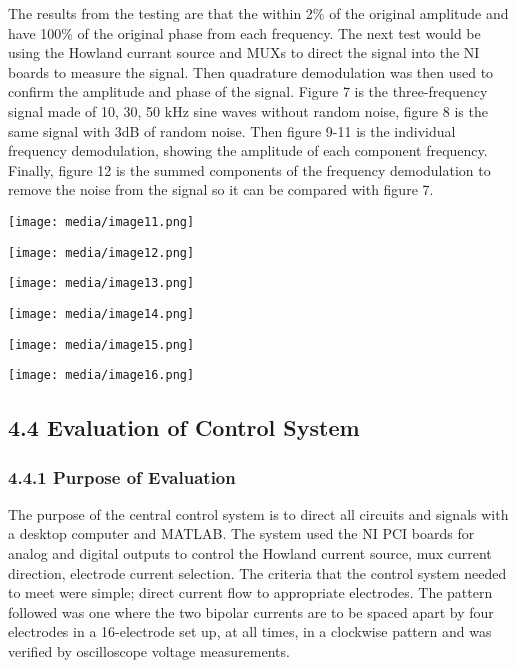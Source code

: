 The results from the testing are that the within 2\% of the original
amplitude and have 100\% of the original phase from each frequency. The
next test would be using the Howland currant source and MUXs to direct
the signal into the NI boards to measure the signal. Then quadrature
demodulation was then used to confirm the amplitude and phase of the
signal. Figure 7 is the three-frequency signal made of 10, 30, 50 kHz
sine waves without random noise, figure 8 is the same signal with 3dB of
random noise. Then figure 9-11 is the individual frequency demodulation,
showing the amplitude of each component frequency. Finally, figure 12 is
the summed components of the frequency demodulation to remove the noise
from the signal so it can be compared with figure 7.

\texttt{[image: media/image11.png]}

\texttt{[image: media/image12.png]}

\texttt{[image: media/image13.png]}

\texttt{[image: media/image14.png]}

\texttt{[image: media/image15.png]}

\texttt{[image: media/image16.png]}

\subsection*{4.4 Evaluation of Control
System}\label{evaluation-of-control-system}

\subsubsection*{\texorpdfstring{\textbf{4.4.1 Purpose of
Evaluation}~}{4.4.1 Purpose of Evaluation~}}\label{purpose-of-evaluation-2}

The purpose of the central control system is to direct all circuits and
signals with a desktop computer and MATLAB. The system used the NI PCI
boards for analog and digital outputs to control the Howland current
source, mux current direction, electrode current selection. The criteria
that the control system needed to meet were simple; direct current flow
to appropriate electrodes. The pattern followed was one where the two
bipolar currents are to be spaced apart by four electrodes in a
16-electrode set up, at all times, in a clockwise pattern and was
verified by oscilloscope voltage measurements.

